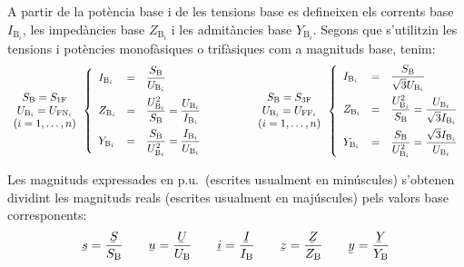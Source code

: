 A partir de la pot\`{e}ncia base i de les tensions base es
defineixen els corrents base $I_{\text{B}_i}$, les imped\`{a}ncies base $Z_{\text{B}_i}$ i les
admit\`{a}ncies base $Y_{\text{B}_i}$. Segons que s'utilitzin les tensions i pot\`{e}ncies monof\`{a}siques o trif\`{a}siques com a magnituds base, tenim:
\begin{equation}
\begin{array}{c}  S_\mathrm{B}=S_\mathrm{1F} \\ U_{\text{B}_i} = U_{\text{FN}_i} \\ (i=1,\ldots,n) \end{array}
\left\{
\begin{array}{lll}
   I_{\text{B}_i} &= &\dfrac{S_\mathrm{B}}{U_{\text{B}_i}} \\[2.5ex]
   Z_{\text{B}_i} &= &\dfrac{U_{\text{B}_i}^2}{S_\mathrm{B}} = \dfrac{U_{\text{B}_i}}{I_{\text{B}_i}} \\[2.5ex]
   Y_{\text{B}_i} &= &\dfrac{S_\mathrm{B}}{U_{\text{B}_i}^2} = \dfrac{I_{\text{B}_i}}{U_{\text{B}_i}}
\end{array}
\right.
\qquad\qquad
\begin{array}{c} S_\mathrm{B}=S_\mathrm{3F} \\ U_{\text{B}_i} = U_{\text{FF}_i} \\ (i=1,\ldots,n) \end{array}
\left\{
\begin{array}{lll}
   I_{\text{B}_i} &= &\dfrac{S_\mathrm{B}}{\sqrt{3} U_{\text{B}_i}} \\[2.5ex]
   Z_{\text{B}_i} &= &\dfrac{U_{\text{B}_i}^2}{S_\mathrm{B}}= \dfrac{U_{\text{B}_i}}{\sqrt{3} I_{\text{B}_i}} \\[2.5ex]
   Y_{\text{B}_i} &= &\dfrac{S_\mathrm{B}}{U_{\text{B}_i}^2} = \dfrac{\sqrt{3} I_{\text{B}_i}}{U_{\text{B}_i}}
\end{array}
\right.
\label{eq:bases_pu}
\end{equation}

Les magnituds expressades en p.u.\ (escrites usualment en min\'{u}scules) s'obtenen
dividint les magnituds reals (escrites usualment en maj\'{u}scules) pels valors base corresponents:
\begin{equation}
   \cmplx{s} = \frac{\cmplx{S}}{S\ped{B}} \qquad \cmplx{u} = \frac{\cmplx{U}}{U\ped{B}} \qquad \cmplx{i} = \frac{\cmplx{I}}{I\ped{B}} \qquad \cmplx{z} = \frac{\cmplx{Z}}{Z\ped{B}} \qquad \cmplx{y} = \frac{\cmplx{Y}}{Y\ped{B}}
\end{equation}

